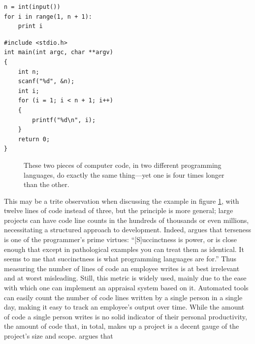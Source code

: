 \documentclass[letterpaper, 12pt]{report}
\begin{document}
\newsavebox{\pythonexample}
\begin{lrbox}{\pythonexample}
\begin{lstlisting}
n = int(input())
for i in range(1, n + 1):
	print i
\end{lstlisting}
\end{lrbox}

\newsavebox{\cexample}
\begin{lrbox}{\cexample}
\begin{lstlisting}
#include <stdio.h>
int main(int argc, char **argv) 
{
	int n;
	scanf("%d", &n);
	int i;
	for (i = 1; i < n + 1; i++) 
	{
		printf("%d\n", i);
	}
	return 0;
}
\end{lstlisting}
\end{lrbox}

\begin{figure}
{\caption{These two pieces of computer code, in two different programming languages, do exactly the same thing---yet one is four times longer than the other.}\label{fig:codelineexample}}
\end{figure}

This may be a trite observation when discussing the example in figure \ref{fig:codelineexample}, with twelve lines of code instead of three, but the principle is more general; large projects can have code line counts in the hundreds of thousands or even millions, necessitating a structured approach to development. 
Indeed, \textcite{graham:succinctness} argues that terseness is one of the programmer's prime virtues:
``[S]uccinctness is power, or is close enough that except in pathological examples you can treat them as identical.
It seems to me that succinctness is what programming languages are for.''
Thus measuring the number of lines of code an employee writes is at best irrelevant and at worst misleading. 
Still, this metric is widely used, mainly due to the ease with which one can implement an appraisal system based on it. 
Automated tools can easily count the number of code lines written by a single person in a single day, making it easy to track an employee's output over time. 
While the amount of code a single person writes is no solid indicator of their personal productivity, the amount of code that, in total, makes up a project is a decent gauge of the project's size and scope. 
\textcite{fowler:cannotmeasure} argues that
\end{document}
